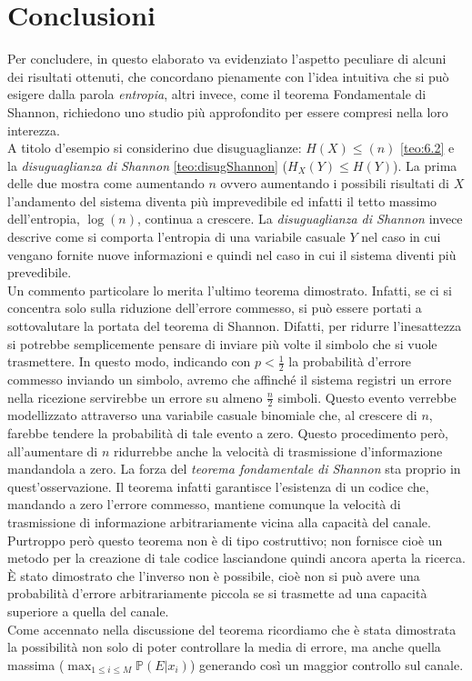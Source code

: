 \chapter{Conclusioni}
\label{cha:conclusioni}
Per concludere, in questo elaborato va evidenziato l'aspetto peculiare di alcuni dei risultati ottenuti, che concordano pienamente con l'idea intuitiva che si può esigere dalla parola \textit{entropia}, altri invece, come il teorema Fondamentale di Shannon, richiedono uno studio più approfondito per essere compresi nella loro interezza.\\
A titolo d'esempio si considerino due disuguaglianze: $H(X)\leq(n)$ \ref{teo:6.2} e la \textit{disuguaglianza di Shannon} \ref{teo:disugShannon} ($H_X(Y)\leq H(Y)$). La prima delle due mostra come aumentando $n$ ovvero aumentando i possibili risultati di $X$ l'andamento  del sistema diventa più imprevedibile ed infatti il tetto massimo dell'entropia, $\log(n)$, continua a crescere. La \textit{disuguaglianza di Shannon} invece descrive come si comporta l'entropia di una variabile casuale $Y$ nel caso in cui vengano fornite nuove informazioni e quindi nel caso in cui il sistema diventi più prevedibile.\\ 
Un commento particolare lo merita l'ultimo teorema dimostrato. Infatti, se ci si concentra solo sulla riduzione dell'errore commesso, si può essere portati a sottovalutare la portata del teorema di Shannon. Difatti, per ridurre l'inesattezza si potrebbe semplicemente pensare di inviare più volte il simbolo che si vuole trasmettere. In questo modo, indicando con $p<\frac{1}{2}$ la probabilità d'errore commesso inviando un simbolo, avremo che affinché il sistema registri un errore nella ricezione servirebbe un errore su almeno $\frac{n}{2}$ simboli. Questo evento verrebbe modellizzato attraverso una variabile casuale binomiale che, al crescere di $n$, farebbe tendere la probabilità di tale evento a zero. Questo procedimento però, all'aumentare di $n$ ridurrebbe anche la velocità di trasmissione d'informazione mandandola a zero. La forza del \textit{teorema fondamentale di Shannon} sta proprio in quest'osservazione. Il teorema infatti garantisce l'esistenza di un codice che, mandando a zero l'errore commesso, mantiene comunque la velocità di trasmissione di informazione arbitrariamente vicina alla capacità del canale. Purtroppo però questo teorema non è di tipo costruttivo; non fornisce cioè un metodo per la creazione di tale codice lasciandone quindi ancora aperta la ricerca.\\
È stato dimostrato che l'inverso non è possibile, cioè non si può avere una probabilità d'errore arbitrariamente piccola se si trasmette ad una capacità superiore a quella del canale.\\
Come accennato nella discussione del teorema ricordiamo che  è stata dimostrata la possibilità non solo di poter controllare la media di errore, ma anche quella massima ($\max_{1\leq i \leq M} \mathbb{P}(E|x_i)$) generando così un maggior controllo sul canale.







